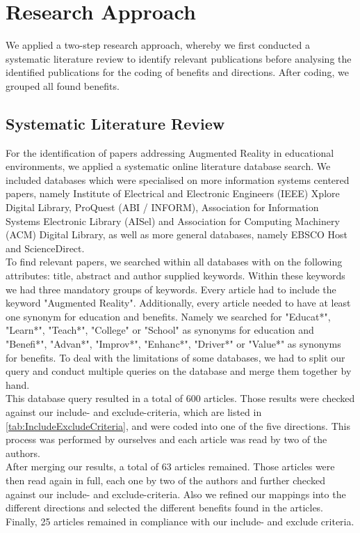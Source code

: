 \section{Research Approach}
We applied a two-step research approach, whereby we first conducted a systematic literature review to identify relevant publications before analysing the identified publications for the coding of benefits and directions. After coding, we grouped all found benefits.

\subsection{Systematic Literature Review}
For the identification of papers addressing Augmented Reality in educational environments, we applied a systematic online literature database search. We included databases which were specialised on more information systems centered papers, namely Institute of Electrical and Electronic Engineers (IEEE) Xplore Digital Library, ProQuest (ABI / INFORM), Association for Information Systems Electronic Library (AISel) and Association for Computing Machinery (ACM) Digital Library, as well as more general databases, namely EBSCO Host and ScienceDirect.\\
To find relevant papers, we searched within all databases with on the following attributes: title, abstract and author supplied keywords. Within these keywords we had three mandatory groups of keywords. Every article had to include the keyword "Augmented Reality". Additionally, every article needed to have at least one synonym for education and benefits. Namely we searched for "Educat*", "Learn*", "Teach*", "College" or "School" as synonyms for education and "Benefi*", "Advan*", "Improv*", "Enhanc*", "Driver*" or "Value*" as synonyms for benefits. To deal with the limitations of some databases, we had to split our query and conduct multiple queries on the database and merge them together by hand.\\
This database query resulted in a total of 600 articles. Those results were checked against our include- and exclude-criteria, which are listed in \ref{tab:IncludeExcludeCriteria}, and were coded into one of the five directions. This process was performed by ourselves and each article was read by two of the authors.\\
After merging our results, a total of 63 articles remained. Those articles were then read again in full, each one by two of the authors and further checked against our include- and exclude-criteria. Also we refined our mappings into the different directions and selected the different benefits found in the articles.\\
Finally, 25 articles remained in compliance with our include- and exclude criteria.

